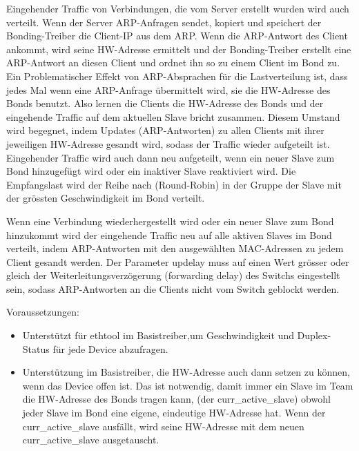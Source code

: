 \begin{description}
\begin{description}
  Eingehender Traffic von Verbindungen, die vom Server erstellt wurden
  wird auch verteilt. Wenn der Server ARP-Anfragen sendet, kopiert und
  speichert der Bonding-Treiber die Client-IP aus dem ARP. Wenn die
  ARP-Antwort des Client ankommt, wird seine HW-Adresse ermittelt und
  der Bonding-Treiber erstellt eine ARP-Antwort an diesen Client und
  ordnet ihn so zu einem Client im Bond zu. Ein Problematischer Effekt
  von ARP-Absprachen für die Lastverteilung ist, dass jedes Mal wenn
  eine ARP-Anfrage übermittelt wird, sie die HW-Adresse des Bonds
  benutzt. Also lernen die Clients die HW-Adresse des Bonds und der
  eingehende Traffic auf dem aktuellen Slave bricht zusammen. Diesem
  Umstand wird begegnet, indem Updates (ARP-Antworten) zu allen
  Clients mit ihrer jeweiligen HW-Adresse gesandt wird, sodass der
  Traffic wieder aufgeteilt ist. Eingehender Traffic wird auch dann
  neu aufgeteilt, wenn ein neuer Slave zum Bond hinzugefügt wird oder
  ein inaktiver Slave reaktiviert wird. Die Empfangslast wird der
  Reihe nach (Round-Robin) in der Gruppe der Slave mit der grössten
  Geschwindigkeit im Bond verteilt.

  Wenn eine Verbindung wiederhergestellt wird oder ein neuer Slave zum
  Bond hinzukommt wird der eingehende Traffic neu auf alle aktiven
  Slaves im Bond verteilt, indem ARP-Antworten mit den ausgewählten
  MAC-Adressen zu jedem Client gesandt werden.  Der Parameter updelay
  muss auf einen Wert grösser oder gleich der
  Weiterleitungsverzögerung (forwarding delay) des Switchs eingestellt
  sein, sodass ARP-Antworten an die Clients nicht vom Switch geblockt
  werden.

  Voraussetzungen:

  \begin{itemize}

    \item Unterstützt für ethtool im Basistreiber,um Geschwindigkeit
          und Duplex-Status für jede Device abzufragen.

    \item Unterstützung im Basistreiber, die HW-Adresse auch dann
          setzen zu können, wenn das Device offen ist. Das ist
          notwendig, damit immer ein Slave im Team die HW-Adresse des
          Bonds tragen kann, (der curr\_active\_slave) obwohl jeder
          Slave im Bond eine eigene, eindeutige HW-Adresse hat. Wenn
          der curr\_active\_slave ausfällt, wird seine HW-Adresse mit
          dem neuen curr\_active\_slave ausgetauscht.

  \end{itemize}


\end{description}
\end{description}
